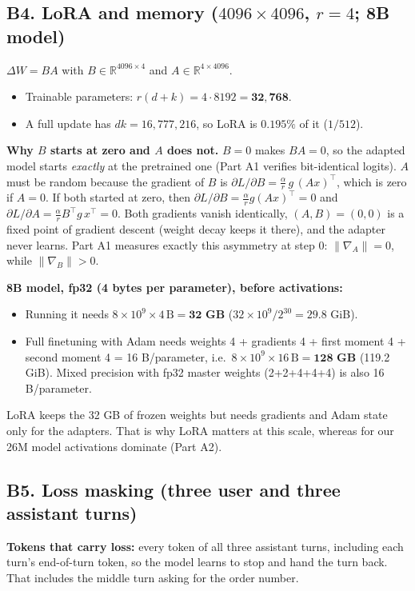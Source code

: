 \subsection*{B4. LoRA and memory ($4096\times4096$, $r=4$; 8B model)}
$\Delta W=BA$ with $B\in\mathbb{R}^{4096\times4}$ and $A\in\mathbb{R}^{4\times4096}$.
\begin{itemize}[leftmargin=*,nosep]
\item Trainable parameters: $r(d+k)=4\cdot8192=\mathbf{32{,}768}$.
\item A full update has $dk=16{,}777{,}216$, so LoRA is $\mathbf{0.195\%}$ of it ($1/512$).
\end{itemize}
\textbf{Why $B$ starts at zero and $A$ does not.} $B=0$ makes $BA=0$, so the adapted model starts \emph{exactly} at the pretrained one (Part A1 verifies bit-identical logits). $A$ must be random because the gradient of $B$ is $\partial L/\partial B=\tfrac{\alpha}{r}\,g\,(Ax)^{\top}$, which is zero if $A=0$. If both started at zero, then $\partial L/\partial B=\tfrac{\alpha}{r}g(Ax)^{\top}=0$ and $\partial L/\partial A=\tfrac{\alpha}{r}B^{\top}g\,x^{\top}=0$. Both gradients vanish identically, $(A,B)=(0,0)$ is a fixed point of gradient descent (weight decay keeps it there), and the adapter never learns. Part A1 measures exactly this asymmetry at step 0: $\|\nabla_A\|=0$, while $\|\nabla_B\|>0$.

\textbf{8B model, fp32 (4 bytes per parameter), before activations:}
\begin{itemize}[leftmargin=*,nosep]
\item Running it needs $8\times10^9\times4\,\text{B}=\mathbf{32}$ \textbf{GB} ($32\times10^9/2^{30}=29.8$ GiB).
\item Full finetuning with Adam needs weights 4 + gradients 4 + first moment 4 + second moment 4 = 16 B/parameter, i.e.\ $8\times10^9\times16\,\text{B}=\mathbf{128}$ \textbf{GB} (119.2 GiB). Mixed precision with fp32 master weights (2+2+4+4+4) is also 16 B/parameter.
\end{itemize}
LoRA keeps the 32 GB of frozen weights but needs gradients and Adam state only for the adapters. That is why LoRA matters at this scale, whereas for our 26M model activations dominate (Part A2).

\subsection*{B5. Loss masking (three user and three assistant turns)}
\textbf{Tokens that carry loss:} every token of all three assistant turns, including each turn's end-of-turn token, so the model learns to stop and hand the turn back. That includes the middle turn asking for the order number.

